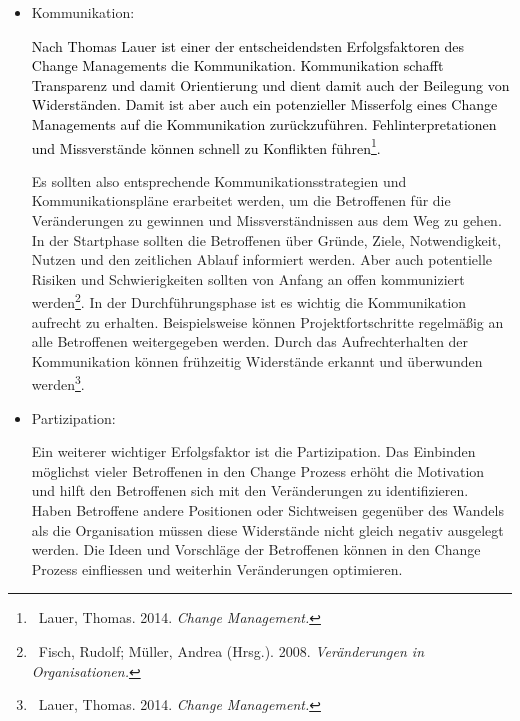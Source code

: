 \documentclass[a4paper]{article}
\newcommand\liststyleLii{%
\renewcommand\labelitemi{•}
\renewcommand\labelitemii{◦}
\renewcommand\labelitemiii{${\blacksquare}$}
\renewcommand\labelitemiv{•}
}
\begin{document}
\liststyleLii
\begin{itemize}
\item {\sffamily
Kommunikation:}

{\sffamily
\textcolor{black}{Nach Thomas Lauer ist einer der entscheidendsten Erfolgsfaktoren des Change Managements die
Kommunikation. Kommunikation schafft Transparenz und damit Orientierung und dient damit auch der Beilegung von
Widerständen. Damit ist aber auch ein potenzieller Misserfolg eines Change Managements auf die Kommunikation
zurückzuführen. Fehlinterpretationen und Missverstände können schnell zu Konflikten führen}\footnote{\textsf{\ Lauer,
Thomas. 2014. }\textsf{\textit{\textcolor[rgb]{0.06666667,0.06666667,0.06666667}{Change
Management.}}}}\textcolor{black}{.}}


\bigskip

{\sffamily
Es sollten also entsprechende Kommunikationsstrategien und Kommunikationspläne erarbeitet werden, um die Betroffenen für
die Veränderungen zu gewinnen und Missverständnissen aus dem Weg zu gehen. In der Startphase sollten die Betroffenen
über Gründe, Ziele, Notwendigkeit, Nutzen und den zeitlichen Ablauf informiert werden. Aber auch potentielle Risiken
und Schwierigkeiten sollten von Anfang an offen kommuniziert
werden\footnote{\textcolor[rgb]{0.12941177,0.11764706,0.11764706}{\ Fisch, Rudolf; Müller, Andrea (Hrsg.). 2008.
}\textit{\textcolor[rgb]{0.12941177,0.11764706,0.11764706}{Veränderungen in Organisationen.}}}. In der
Durchführungsphase ist es wichtig die Kommunikation aufrecht zu erhalten. Beispielsweise können Projektfortschritte
regelmäßig an alle Betroffenen weitergegeben werden. Durch das Aufrechterhalten der Kommunikation können frühzeitig
Widerstände erkannt und überwunden werden\footnote{\textsf{\ Lauer, Thomas. 2014.
}\textsf{\textit{\textcolor[rgb]{0.06666667,0.06666667,0.06666667}{Change Management.}}}}. }


\bigskip
\item {\sffamily
Partizipation:}

{\sffamily
Ein weiterer wichtiger Erfolgsfaktor ist die Partizipation. Das Einbinden möglichst vieler Betroffenen in den Change
Prozess erhöht die Motivation und hilft den Betroffenen sich mit den Veränderungen zu identifizieren. Haben Betroffene
andere Positionen oder Sichtweisen gegenüber des Wandels als die Organisation müssen diese Widerstände nicht gleich
negativ ausgelegt werden. Die Ideen und Vorschläge der Betroffenen können in den Change Prozess einfliessen und
weiterhin Veränderungen optimieren. }



\end{itemize}
\end{document}
